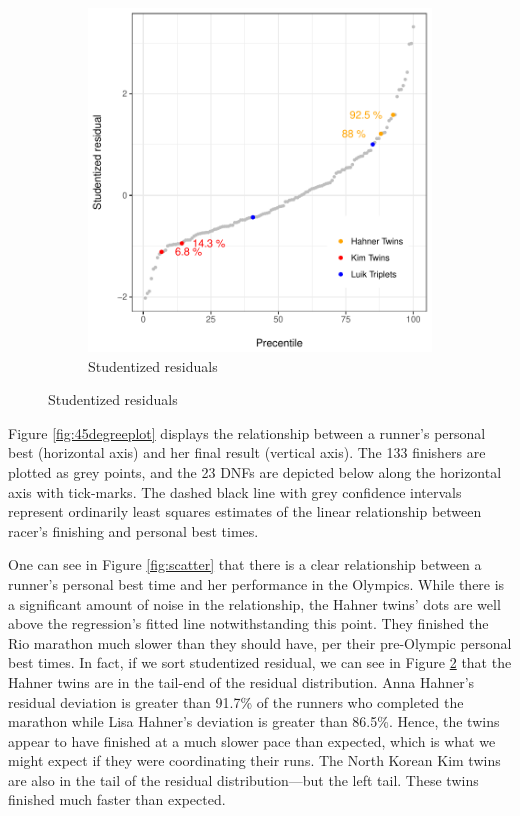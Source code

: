 \documentclass[12pt,titlepage]{article}
\begin{document}
\begin{figure}[!ht]
\begin{subfigure}{.5\textwidth}
    \includegraphics[width=.975\textwidth, keepaspectratio]{studentized_residuals.pdf}
    \caption{Studentized residuals}
    \label{fig:studentizedresiduals}
  \end{subfigure}
\end{figure}

Figure \ref{fig:45degreeplot} displays the relationship between a
runner's personal best (horizontal axis) and her final result
(vertical axis).  The 133 finishers are plotted as grey points, and
the 23 DNFs are depicted below along the horizontal axis with
tick-marks.  The dashed black line with grey confidence intervals
represent ordinarily least squares estimates of the linear
relationship between racer's finishing and personal best times.

One can see in Figure \ref{fig:scatter} that there is a clear
relationship between a runner's personal best time and her performance
in the Olympics.  While there is a significant amount of noise in the
relationship, the Hahner twins' dots are well above the regression's
fitted line notwithstanding this point.  They finished the Rio
marathon much slower than they should have, per their pre-Olympic
personal best times.  In fact, if we sort studentized residual, we can
see in Figure \ref{fig:studentizedresiduals} that the Hahner twins are
in the tail-end of the residual distribution.  Anna Hahner's residual
deviation is greater than 91.7\% of the runners who completed the
marathon while Lisa Hahner's deviation is greater than 86.5\%.  Hence,
the twins appear to have finished at a much slower pace than expected,
which is what we might expect if they were coordinating their runs.
The North Korean Kim twins are also in the tail of the residual
distribution---but the left tail.  These twins finished much faster
than expected. 
\end{document}
